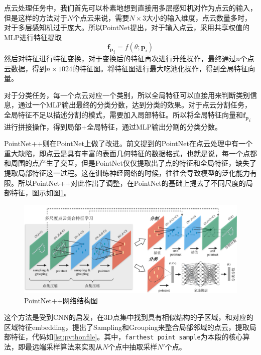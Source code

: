 点云处理任务中，我们首先可以朴素地想到直接用多层感知机\cite{lecun2015deep}对作为点云的输入，但是这样的方法对于$N$个点云来说，需要$N \times 3$大小的输入维度，点云数量多时，对于多层感知机过于庞大。所以PointNet提出，对于输入点云，采用共享权值的MLP进行特征提取
\begin{equation}
    \boldsymbol{f_p}_i = f(\theta; \boldsymbol{p}_i)
\end{equation}
然后对特征进行特征变换，对于变换后的特征再次进行升维操作，最终通过$n$个点云数据，得到$n \times 1024$的特征图。将特征图进行最大吃池化操作，得到全局特征向量。

对于分类任务，每一个点云对应一个类别，所以全局特征可以直接用来判断类别信息，通过一个MLP输出最终的分类分数，达到分类的效果。对于点云分割任务，全局特征不足以描述分割的模式，需要加入局部特征。所以将全局特征向量和$\boldsymbol{f_p}_i$进行拼接操作，得到局部+全局特征，通过MLP输出分割的分类分数。

PointNet++\cite{qi2017pointnet++}则在PointNet上做了改进。前文提到的PointNet在点云处理中有一个重大缺陷，即点云是具有丰富的表面几何特征的数据格式，也就是说，每一个点都和周围的点产生了交互，但是PointNet仅仅提取出了点的特征和全局特征，缺失了提取局部特征这一过程。这在训练神经网络的时候，往往会导致模型的泛化能力有限\cite{qi2017pointnet++}。所以PointNet++对此作出了调整，在PointNet的基础上提去了不同尺度的局部特征，图示如图\ref{fig:pointnet++}。

\begin{figure}
    \centering
    \includegraphics[width=\linewidth]{images/pointnet++.pdf}
    \caption{PointNet++\cite{qi2017pointnet++}网络结构图}
    \label{fig:pointnet++}
    \vspace{-5mm}
\end{figure}

这个方法是受到CNN的启发，在3D点集中找到具有相似结构的子区域，和对应的区域特征embedding，提出了Sampling和Grouping来整合局部邻域的点云，提取局部特征，代码如\ref{lst:pythonfile}。其中，\texttt{farthest point sample}为本段的核心算法，即最远端采样算法来实现从$N$个点中抽取采样$N'$个点。

